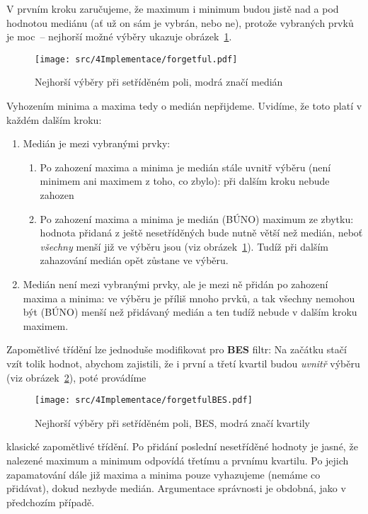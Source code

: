         V prvním kroku zaručujeme, že maximum i minimum budou jistě nad a pod hodnotou mediánu (ať už on sám je vybrán, nebo ne), protože vybraných prvků je \bq moc\eq ~-- nejhorší možné výběry ukazuje obrázek~\ref{obr forgetful}.
        \begin{figure}[h]\label{obr forgetful}
        \begin{center}
          \texttt{[image: src/4Implementace/forgetful.pdf]}
          \caption{Nejhorší výběry při setříděném poli, modrá značí medián}
          \end{center}
        \end{figure}
        Vyhozením minima a maxima tedy o medián nepřijdeme. Uvidíme, že toto platí v každém dalším kroku:
        \begin{enumerate}
          \item Medián je mezi vybranými prvky:
            \begin{enumerate}
                \item Po zahození maxima a minima je medián stále uvnitř výběru (není minimem ani maximem z toho, co zbylo): při dalším kroku nebude zahozen
                \item Po zahození maxima a minima je medián (BÚNO) maximum ze zbytku: hodnota přidaná z ještě nesetříděných bude nutně větší než medián, neboť \emph{všechny} menší již ve výběru jsou (viz obrázek~\ref{obr forgetful}). Tudíž při dalším zahazování medián opět zůstane ve výběru.
            \end{enumerate}
          \item Medián není mezi vybranými prvky, ale je mezi ně přidán po zahození maxima a minima: ve výběru je příliš mnoho prvků, a tak všechny nemohou být (BÚNO) menší než přidávaný medián a ten tudíž nebude v dalším kroku maximem.
        \end{enumerate}
        
        Zapomětlivé třídění lze jednoduše modifikovat pro \textbf{BES} filtr: Na začátku stačí vzít tolik hodnot, abychom zajistili, že i první a třetí kvartil budou \emph{uvnitř} výběru (viz obrázek~\ref{obr forget BES}), poté provádíme 
        \begin{figure}[h]\label{obr forget BES}
        \begin{center}
          \texttt{[image: src/4Implementace/forgetfulBES.pdf]}
          \caption{Nejhorší výběry při setříděném poli, BES, modrá značí kvartily}
          \end{center}
        \end{figure}
        klasické zapomětlivé třídění. Po přidání poslední nesetříděné hodnoty je jasné, že nalezené maximum a minimum odpovídá třetímu a prvnímu kvartilu. Po jejich zapamatování dále již maxima a minima pouze vyhazujeme (nemáme co přidávat), dokud nezbyde medián. Argumentace správnosti je obdobná, jako v předchozím případě.
        
